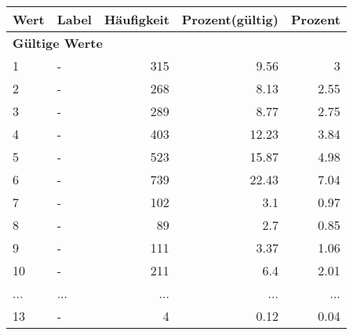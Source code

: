      \begin{longtable}{lXrrr}
     \toprule
     \textbf{Wert} & \textbf{Label} & \textbf{Häufigkeit} & \textbf{Prozent(gültig)} & \textbf{Prozent} \\
     \endhead
     \midrule
     \multicolumn{5}{l}{\textbf{Gültige Werte}}\\
        1 & \multicolumn{1}{X}{-} & %
          \num{315} &
          \num[round-mode=places,round-precision=2]{9.56} &
          \num[round-mode=places,round-precision=2]{3} \\
        2 & \multicolumn{1}{X}{-} & %
          \num{268} &
          \num[round-mode=places,round-precision=2]{8.13} &
          \num[round-mode=places,round-precision=2]{2.55} \\
        3 & \multicolumn{1}{X}{-} & %
          \num{289} &
          \num[round-mode=places,round-precision=2]{8.77} &
          \num[round-mode=places,round-precision=2]{2.75} \\
        4 & \multicolumn{1}{X}{-} & %
          \num{403} &
          \num[round-mode=places,round-precision=2]{12.23} &
          \num[round-mode=places,round-precision=2]{3.84} \\
        5 & \multicolumn{1}{X}{-} & %
          \num{523} &
          \num[round-mode=places,round-precision=2]{15.87} &
          \num[round-mode=places,round-precision=2]{4.98} \\
        6 & \multicolumn{1}{X}{-} & %
          \num{739} &
          \num[round-mode=places,round-precision=2]{22.43} &
          \num[round-mode=places,round-precision=2]{7.04} \\
        7 & \multicolumn{1}{X}{-} & %
          \num{102} &
          \num[round-mode=places,round-precision=2]{3.1} &
          \num[round-mode=places,round-precision=2]{0.97} \\
        8 & \multicolumn{1}{X}{-} & %
          \num{89} &
          \num[round-mode=places,round-precision=2]{2.7} &
          \num[round-mode=places,round-precision=2]{0.85} \\
        9 & \multicolumn{1}{X}{-} & %
          \num{111} &
          \num[round-mode=places,round-precision=2]{3.37} &
          \num[round-mode=places,round-precision=2]{1.06} \\
        10 & \multicolumn{1}{X}{-} & %
          \num{211} &
          \num[round-mode=places,round-precision=2]{6.4} &
          \num[round-mode=places,round-precision=2]{2.01} \\
       ... & ... & ... & ... & ... \\
        13 & \multicolumn{1}{X}{-} & %
          \num{4} &
          \num[round-mode=places,round-precision=2]{0.12} &
          \num[round-mode=places,round-precision=2]{0.04} \\


\end{longtable}
